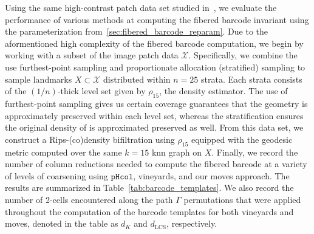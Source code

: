 \documentclass{siamart190516}
\begin{document}
Using the same high-contrast patch data set studied in~\cite{lee2003nonlinear}, we evaluate the performance of various methods at computing the fibered barcode invariant using the parameterization from~\ref{sec:fibered_barcode_reparam}. 
Due to the aformentioned high complexity of the fibered barcode computation, we begin by working with a subset of the image patch data $\mathcal{X}$. Specifically, we combine the use furthest-point sampling and proportionate allocation (stratified) sampling to sample landmarks $X \subset \mathcal{X}$ distributed within $n = 25$ strata. Each strata consists of the $(1/n)$-thick level set given by $\rho_{15}$, the density estimator. The use of furthest-point sampling gives us certain coverage guarantees that the geometry is approximately preserved within each level set, whereas the stratification ensures the original density of is approximated preserved as well. From this data set, we construct a Rips-(co)density bifiltration using $\rho_{15}$ equipped with the geodesic metric computed over the same $k = 15$ knn graph on $X$. 
Finally, we record the number of column reductions needed to compute the fibered barcode at a variety of levels of coarsening using $\mathtt{pHcol}$, vineyards, and our moves approach. The results are summarized in Table~\ref{tab:barcode_templates}. We also record the number of 2-cells encountered along the path $\Gamma$ permutations that were applied throughout the computation of the barcode templates for both vineyards and moves, denoted in the table as $d_K$ and $d_{\mathrm{LCS}}$, respectively. 
\end{document}
